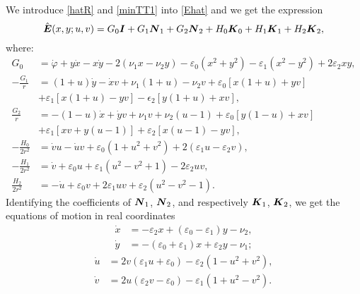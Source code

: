 \documentclass[12pt]{amsart}
\numberwithin{equation}{section}
\theoremstyle{definition}
\begin{document}
We introduce \eqref{hatR} and \eqref{minTT1} into \eqref{Ehat} and we
get the expression
\begin{equation}\label{Ehat1}
\hat{{{\mbox{\boldmath{${E}$}}}}} (x,y;u,v)= G_0{{\mbox{\boldmath{${I}$}}}}+G_1{{\mbox{\boldmath{${N}$}}}}_1+G_2{{\mbox{\boldmath{${N}$}}}}_2+H_0{{\mbox{\boldmath{${K}$}}}}_0+H_1{{\mbox{\boldmath{${K}$}}}}_1+H_2{{\mbox{\boldmath{${K}$}}}}_2,
\end{equation}
where:
\begin{equation}
\begin{split}\label{G0H}
G_0 & = \dot{\varphi} +y\dot{x}-x\dot{y}-2(\nu_1x-\nu_2y)-\varepsilon_0(x^2+y^2) -\varepsilon_1(x^2-y^2)+2\varepsilon_2xy,\\
-\frac{G_1}{r} &= (1+u)\dot{y}-\dot{x}v+\nu_1(1+u)-\nu_2v+\varepsilon_0[x(1+u)+yv]\\ ~~~&+\varepsilon_1[x(1+u)-yv]
-\epsilon_2[y(1+u)+xv],\\
\frac{G_2}{r} &= -(1-u)\dot{x}+\dot{y}v+\nu_1v+\nu_2(u-1)+\varepsilon_0[y(1-u)+xv] \\ ~~~&+\varepsilon_1[xv+y(u-1)] +\varepsilon_2[x(u-1)-yv],\\
-\frac{H_0}{2r^2} & = \dot{v}u-\dot{u}v+\varepsilon_0(1+u^2+v^2)+2(\varepsilon_1u-\varepsilon_2v),\\
-\frac{H_1}{2r^2} & =  \dot{v}+\varepsilon_0u+\varepsilon_1(u^2-v^2+1)-2\varepsilon_2uv,\\
\frac{H_2}{2r^2} & = -\dot{u}+\varepsilon_0v+2\varepsilon_1uv+\varepsilon_2(u^2-v^2-1).
\end{split}
\end{equation}
Identifying the coefficients of ${{\mbox{\boldmath{${N}$}}}}_1$, ${{\mbox{\boldmath{${N}$}}}}_2$, and
respectively  ${{\mbox{\boldmath{${K}$}}}}_1$, ${{\mbox{\boldmath{${K}$}}}}_2$, we get the equations of motion
in real coordinates
\begin{equation}\label{xyec}
\begin{split}
\dot{x} & = -\varepsilon_2x+(\varepsilon_0-\varepsilon_1)y-\nu_2,\\
\dot{y} & = -(\varepsilon_0+\varepsilon_1)x+\varepsilon_2y-\nu_1; 
\end{split}
\end{equation}
\begin{equation}\label{uvec}
\begin{split}
\dot{u} & = 2v(\varepsilon_1u+\varepsilon_0)-\varepsilon_2(1-u^2+v^2),\\
\dot{v}&  =  2u(\varepsilon_2v-\varepsilon_0)-\varepsilon_1(1+u^2-v^2). 
\end{split}
\end{equation}
\end{document}

